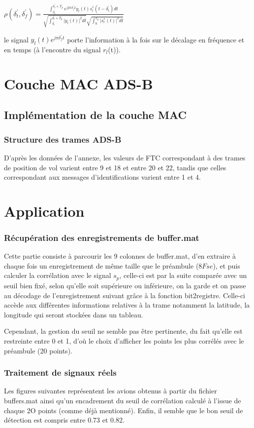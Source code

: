 \documentclass{rapport}
\begin{document}
{{\Large $\rho(\delta_t^{'}, \delta_f^{'}) =  \frac{\int_{\delta_t^{'}}^{\delta_t^{'} + T_p} e^{j2\pi\delta_f^{'}t} y_l(t)s_l^*(t - \delta_t^{'}) dt }{\sqrt{\int_{\delta_t^{'}}^{\delta_t^{'} + T_p} \lvert y_l(t) \rvert^2 dt} \sqrt{ \int_{0}^{ T_p}\lvert s_l^*(t)\rvert^2 dt}} $}

le signal $y_l(t)e^{j\pi\delta_f^{'}t}$ porte l'information à la fois sur le décalage en fréquence et en temps (à l'encontre du signal $r_l$(t)).
\section{\Large Couche MAC ADS-B}
\subsection{\Large Implémentation de la couche MAC}
\subsubsection{Structure des trames ADS-B}
D'après les données de l'annexe, les valeurs de FTC correspondant à des trames de position de vol varient entre 9 et 18 et entre 20 et 22, tandis que celles correspondant aux messages d'identifications varient entre 1 et 4.
\section{\Large Application}
\subsubsection{Récupération des enregistrements de buffer.mat}
Cette partie consiste à parcourir les 9 colonnes de buffer.mat, d'en extraire à chaque fois un enregistrement de même taille que le préambule ($8Fse$), et puis calculer la corrélation avec le signal $s_p$, celle-ci est par la suite comparée avec un seuil bien fixé, selon qu'elle soit supérieure ou inférieure, on la garde et on passe au décodage de l'enregistrement suivant grâce à la fonction bit2registre. Celle-ci accède aux différentes informations relatives à la trame notamment la latitude, la longitude qui seront stockées dans un tableau.

Cependant, la gestion du seuil ne semble pas être pertinente, du fait qu'elle est restreinte entre 0 et 1, d'où le choix d'afficher les points les plus corrélés avec le préambule (20 points). 

\subsubsection{\Large Traitement de signaux réels}
Les figures suivantes représentent les avions obtenus à partir du fichier buffers.mat ainsi qu'un encadrement du seuil de corrélation calculé à l'issue de chaque 2O points (comme déjà mentionné).
Enfin, il semble que le bon seuil de détection est compris entre 0.73 et 0.82.

}
\end{document}
